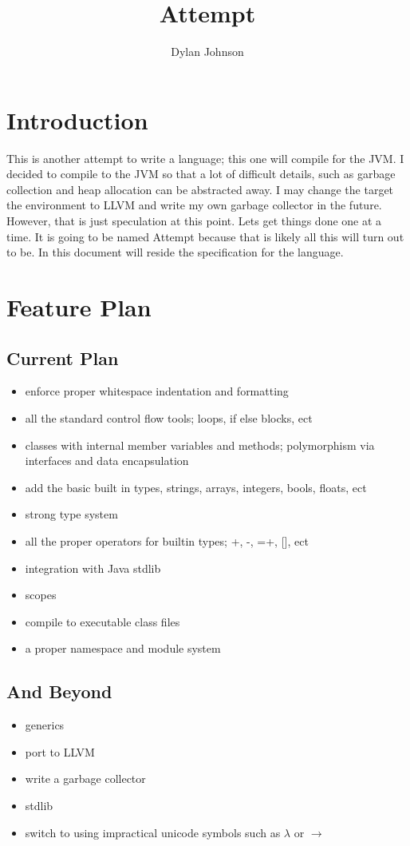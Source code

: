 \documentclass{article}
\author{Dylan Johnson}
\title{Attempt}
\newcommand{\centersec}[1]{\section*{\hfil #1 \hfil}}
\newcommand{\subcentersec}[1]{\subsection*{\hfil #1 \hfil}}
\begin{document}
  \maketitle

  \centersec{Introduction}
    This is another attempt to write a language; this one will compile for the JVM. I decided to compile
    to the JVM so that a lot of difficult details, such as garbage collection and heap allocation
    can be abstracted away. I may change the target the environment to LLVM and write my own garbage
    collector in the future. However, that is just speculation at this point. Lets get things done one
    at a time. It is going to be named Attempt because that is likely all this will turn out to be.
    In this document will reside the specification for the language.

  \centersec{Feature Plan}
    \subcentersec{Current Plan}
      \begin{itemize}
        \item{enforce proper whitespace indentation and formatting}
        \item{all the standard control flow tools; loops, if else blocks, ect}
        \item{classes with internal member variables and methods; polymorphism via interfaces and data encapsulation}
        \item{add the basic built in types, strings, arrays, integers, bools, floats, ect}
        \item{strong type system}
        \item{all the proper operators for builtin types; +, -, =+, [], ect}
        \item{integration with Java stdlib}
        \item{scopes}
        \item{compile to executable class files}
        \item{a proper namespace and module system}
      \end{itemize}

    \subcentersec{And Beyond}
      \begin{itemize}
        \item{generics}
        \item{port to LLVM}
        \item{write a garbage collector}
        \item{stdlib}
        \item{switch to using impractical unicode symbols such as $ \lambda $ or $ \rightarrow $}
      \end{itemize}
\end{document}
